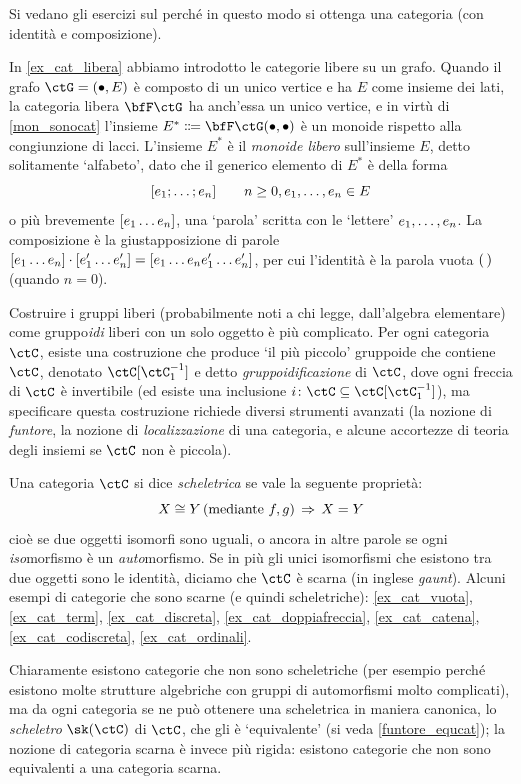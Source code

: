 Si vedano gli esercizi sul perché in questo modo si ottenga una categoria (con identità e composizione).
\begin{example}\label{mongruppi_liberi}
 In \ref{ex_cat_libera} abbiamo introdotto le categorie libere su un grafo. Quando il grafo \(\ctG=(\bullet,E)\) è composto di un unico vertice e ha \(E\) come insieme dei lati, la categoria libera \(\bfF\ctG\) ha anch'essa un unico vertice, e in virtù di \ref{mon_sonocat} l'insieme \(E^* \defeq  \bfF\ctG(\bullet,\bullet)\) è un monoide rispetto alla congiunzione di lacci. L'insieme \(E^*\) è il \emph{monoide libero} sull'insieme \(E\), detto solitamente `alfabeto', dato che il generico elemento di \(E^*\) è della forma
 \[[\tup en;]\qquad n\ge 0, \tup en,\in E\]
 o più brevemente \([\tup en{}]\), una `parola' scritta con le `lettere' \({\tup en,}\). La composizione è la giustapposizione di parole \([\tup en{}]\cmp[\tup {e'}n{}] = [\tup en{}\tup{e'}n{}]\), per cui l'identità è la parola vuota \((\,)\) (quando \(n=0\)).

 Costruire i gruppi liberi (probabilmente noti a chi legge, dall'algebra elementare) come gruppo\emph{idi} liberi con un solo oggetto è più complicato. Per ogni categoria \(\ctC\), esiste una costruzione che produce `il più piccolo' gruppoide che contiene \(\ctC\), denotato \(\ctC[\ctC_1^{-1}]\) e detto \emph{gruppoidificazione} di \(\ctC\), dove ogni freccia di \(\ctC\) è invertibile (ed esiste una inclusione \(i \colon \ctC\subseteq \ctC[\ctC_1^{-1}]\)), ma specificare questa costruzione richiede diversi strumenti avanzati (la nozione di \emph{funtore}, la nozione di \emph{localizzazione} di una categoria, e alcune accortezze di teoria degli insiemi se \(\ctC\) non è piccola).
\end{example}
\begin{definition}\label{def_cat_scheletrica}
 Una categoria \(\ctC\) si dice \emph{scheletrica} se vale la seguente proprietà:
 \[X\cong Y \, (\text{mediante } f,g) \,\Rightarrow\, X=Y\]
 cioè se due oggetti isomorfi sono uguali, o ancora in altre parole se ogni \emph{iso}morfismo è un \emph{auto}morfismo. Se in più gli unici isomorfismi che esistono tra due oggetti sono le identità, diciamo che \(\ctC\) è scarna (in inglese \emph{gaunt}). Alcuni esempi di categorie che sono scarne (e quindi scheletriche): \ref{ex_cat_vuota}, \ref{ex_cat_term}, \ref{ex_cat_discreta}, \ref{ex_cat_doppiafreccia}, \ref{ex_cat_catena}, \ref{ex_cat_codiscreta}, \ref{ex_cat_ordinali}.
\end{definition}
Chiaramente esistono categorie che non sono scheletriche (per esempio perché esistono molte strutture algebriche con gruppi di automorfismi molto complicati), ma da ogni categoria se ne può ottenere una scheletrica in maniera canonica, lo \emph{scheletro} \(\sk(\ctC)\) di \(\ctC\), che gli è `equivalente' (si veda \ref{funtore_equcat}); la nozione di categoria scarna è invece più rigida: esistono categorie che non sono equivalenti a una categoria scarna.

